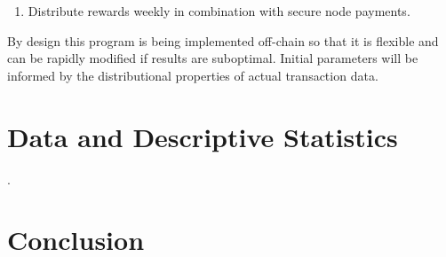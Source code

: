 \documentclass[11pt, oneside]{article}   	%
\begin{document}
\begin{enumerate}[resume]
	\item Distribute rewards weekly in combination with secure node payments. 
\end{enumerate}

By design this program is being implemented off-chain so that it is flexible and can be rapidly modified if results are suboptimal. Initial parameters will be informed by the distributional properties of actual transaction data. 

\vspace{10 mm}
\section{Data and Descriptive Statistics}
. 



\vspace{10 mm}
\section{Conclusion}






\clearpage
\newpage
\begin{thebibliography}{9}



\end{thebibliography}
\end{document}
